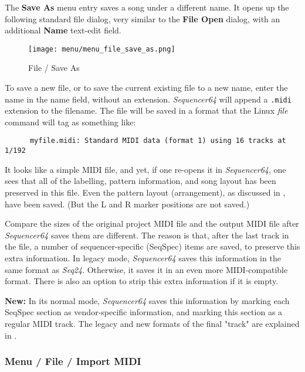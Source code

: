    The \textbf{Save As} menu entry saves a song under a different name.
   It opens up the following standard file dialog, very similar to the 
   \textbf{File Open} dialog, with an additional \textbf{Name} text-edit field.

\begin{figure}[H]
   \centering 
   \texttt{[image: menu/menu\_file\_save\_as.png]}
   \caption{File / Save As}
   \label{fig:seq64_menu_file_save_as}
\end{figure}

   To save a new file, or to save the current existing file to a new name,
   enter the name in the name field, without an extension.
   \textsl{Sequencer64} will append a \texttt{.midi} extension to the filename.
   The file will be saved in a format that the Linux \textsl{file} command
   will tag as something like:

   \begin{verbatim}
      myfile.midi: Standard MIDI data (format 1) using 16 tracks at 1/192
   \end{verbatim}

   It looks like a simple MIDI file, and yet, if one re-opens it in
   \textsl{Sequencer64}, one sees that all of the labelling, pattern information,
   and song layout has been preserved in this file.
   Even the pattern layout (arrangement), as discussed in
   ,
   have been saved.
   (But the L and R marker positions are not saved.)

   Compare the sizes of the original project MIDI file
   and the output MIDI file after \textsl{Sequencer64} saves them
   are different.
   The reason is that, after the last track in the file, a number of
   sequencer-specific (SeqSpec) items are saved, to preserve this extra
   information.  In legacy mode, \textsl{Sequencer64} saves this information
   in the same format as \textsl{Seq24}. Otherwise, it saves it
   in an even more MIDI-compatible format.  There is also an option to strip
   this extra information if it is empty.

   \textbf{New:}
   In its normal mode, \textsl{Sequencer64} saves this
   information by marking each SeqSpec section
   as vendor-specific information, and marking this section as a regular
   MIDI track.
   The legacy and new formats of the final "track" are explained in
   .

\subsubsection{Menu / File / Import MIDI}
\label{subsubsec:seq64_menu_file_import}

